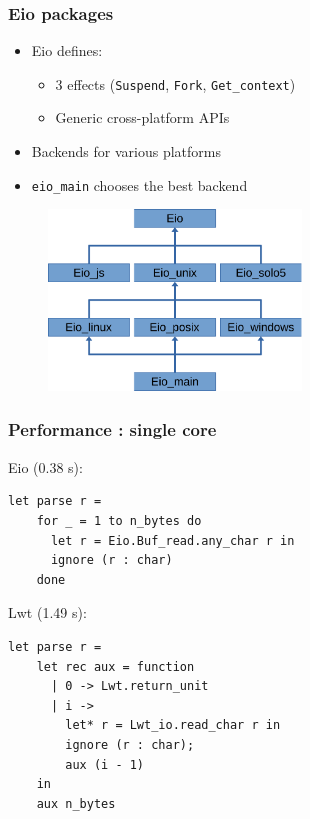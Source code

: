 \documentclass{beamer}
\begin{document}
\begin{frame}[fragile]
	\frametitle{Eio packages}
	\begin{itemize}
                \item Eio defines:
                        \begin{itemize}
                                \item 3 effects (\verb|Suspend|, \verb|Fork|, \verb|Get_context|)
                                \item Generic cross-platform APIs
                        \end{itemize}
		\item Backends for various platforms
		\item \verb|eio_main| chooses the best backend
	\end{itemize}
	\begin{figure}
	\includegraphics[width=0.6\textwidth]{arch.pdf}
	\end{figure}
\end{frame}

\begin{frame}[fragile]
	\frametitle{Performance : single core}
	\bigskip
	Eio (0.38 s):
\begin{lstlisting}[style=ocaml]
  let parse r =
    for _ = 1 to n_bytes do
      let r = Eio.Buf_read.any_char r in
      ignore (r : char)
    done
\end{lstlisting}
	\bigskip
	Lwt (1.49 s):
\begin{lstlisting}[style=ocaml]
  let parse r =
    let rec aux = function
      | 0 -> Lwt.return_unit
      | i ->
        let* r = Lwt_io.read_char r in
        ignore (r : char);
        aux (i - 1)
    in
    aux n_bytes
\end{lstlisting}
\end{frame}
\end{document}
